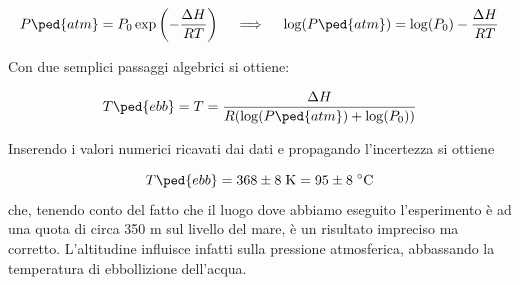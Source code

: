 \begin{equation}
    P\ped{atm} =  P_0 \exp \left( - \frac{\Delta H}{RT} \right) 
        \quad \implies \quad
    \log (P\ped{atm}) = \log (P_0) - \frac{\Delta H}{RT}
\end{equation}

Con due semplici passaggi algebrici si ottiene:

\begin{equation}
    T\ped{ebb} = T = \frac{\Delta H}{R(\log (P\ped{atm}) + \log (P_0))}
\end{equation}

Inserendo i valori numerici ricavati dai dati e propagando l'incertezza si ottiene

\begin{equation}
    T\ped{ebb} = 368 \pm 8 \; \si{\kelvin} = 95 \pm 8 \; \si{\celsius}
\end{equation}
%
che, tenendo conto del fatto che il luogo dove abbiamo eseguito l'esperimento è ad una quota di circa 350 m
sul livello del mare, è un risultato impreciso ma corretto. L'altitudine influisce infatti sulla pressione atmosferica,
abbassando la temperatura di ebbollizione dell'acqua.
